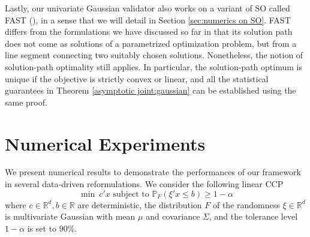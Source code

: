 \documentclass[mnsc,blindrev]{informs4} %
\newcommand{\R}{\mathbb{R}}
\begin{document}
Lastly, our univariate Gaussian validator also works on a variant of SO called FAST (\cite{care2014fast}), in a sense that we will detail in Section \ref{sec:numerics on SO}. FAST differs from the formulations we have discussed so far in that its solution path does not come as solutions of a parametrized optimization problem, but from a line segment connecting two suitably chosen solutions. Nonetheless, the notion of solution-path optimality still applies. In particular, the solution-path optimum is unique if the objective is strictly convex or linear, and all the statistical guarantees in Theorem \ref{asymptotic joint:gaussian} can be established using the same proof.






\section{Numerical Experiments}\label{sec:numerics}
We present numerical results to demonstrate the performances of our framework in several data-driven reformulations. We consider the following linear CCP
\begin{equation}\label{ccp}
\min\  c'x\text{\ \ subject to\ \ }\mathbb P_F(\xi'x\leq b)\geq 1-\alpha
\end{equation}
where $c\in\R^d,b\in\R$ are deterministic, the distribution $F$ of the randomness $\xi\in\R^d$ is multivariate Gaussian with mean $\mu$ and covariance $\Sigma$, and the tolerance level $1-\alpha$ is set to $90\%$.
\end{document}
